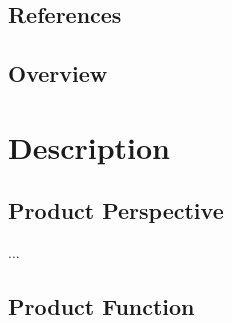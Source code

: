 \documentclass[12pt]{article} %
\begin{document}
\subsection{References}




\subsection{Overview}




\section{Description}

\subsection{Product Perspective}
...


\subsection{Product Function}



\end{document}
